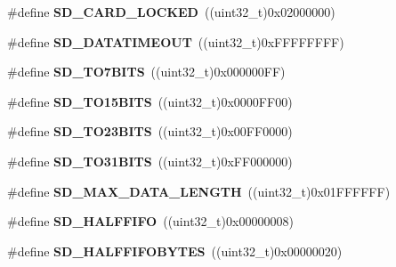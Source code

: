 \begin{DoxyCompactItemize}
\item 
\#define {\bfseries S\+D\+\_\+\+C\+A\+R\+D\+\_\+\+L\+O\+C\+K\+ED}~((uint32\+\_\+t)0x02000000)\hypertarget{group__sd__card__private_ga0560d0e5f15b8c676bd1c53bf0ac381f}{}\label{group__sd__card__private_ga0560d0e5f15b8c676bd1c53bf0ac381f}

\item 
\#define {\bfseries S\+D\+\_\+\+D\+A\+T\+A\+T\+I\+M\+E\+O\+UT}~((uint32\+\_\+t)0x\+F\+F\+F\+F\+F\+F\+F\+F)\hypertarget{group__sd__card__private_ga9ca34cf6f4e38835347bc2dc29f9469e}{}\label{group__sd__card__private_ga9ca34cf6f4e38835347bc2dc29f9469e}

\item 
\#define {\bfseries S\+D\+\_\+T\+O7\+B\+I\+TS}~((uint32\+\_\+t)0x000000\+F\+F)\hypertarget{group__sd__card__private_ga37de3e6a7edfd787d09efddc589120ae}{}\label{group__sd__card__private_ga37de3e6a7edfd787d09efddc589120ae}

\item 
\#define {\bfseries S\+D\+\_\+T\+O15\+B\+I\+TS}~((uint32\+\_\+t)0x0000\+F\+F00)\hypertarget{group__sd__card__private_ga2057731e114d40de0d0d6d2ff74f1501}{}\label{group__sd__card__private_ga2057731e114d40de0d0d6d2ff74f1501}

\item 
\#define {\bfseries S\+D\+\_\+T\+O23\+B\+I\+TS}~((uint32\+\_\+t)0x00\+F\+F0000)\hypertarget{group__sd__card__private_ga177a89af799d66f7782e6e8dd4e1438f}{}\label{group__sd__card__private_ga177a89af799d66f7782e6e8dd4e1438f}

\item 
\#define {\bfseries S\+D\+\_\+T\+O31\+B\+I\+TS}~((uint32\+\_\+t)0x\+F\+F000000)\hypertarget{group__sd__card__private_ga3d61f23b4fcf1efb4a16b26bd1f54550}{}\label{group__sd__card__private_ga3d61f23b4fcf1efb4a16b26bd1f54550}

\item 
\#define {\bfseries S\+D\+\_\+\+M\+A\+X\+\_\+\+D\+A\+T\+A\+\_\+\+L\+E\+N\+G\+TH}~((uint32\+\_\+t)0x01\+F\+F\+F\+F\+F\+F)\hypertarget{group__sd__card__private_ga3be502d718368f47d02b554e863f30b1}{}\label{group__sd__card__private_ga3be502d718368f47d02b554e863f30b1}

\item 
\#define {\bfseries S\+D\+\_\+\+H\+A\+L\+F\+F\+I\+FO}~((uint32\+\_\+t)0x00000008)\hypertarget{group__sd__card__private_ga96eec3ea095e393f51ab2686d928908c}{}\label{group__sd__card__private_ga96eec3ea095e393f51ab2686d928908c}

\item 
\#define {\bfseries S\+D\+\_\+\+H\+A\+L\+F\+F\+I\+F\+O\+B\+Y\+T\+ES}~((uint32\+\_\+t)0x00000020)\hypertarget{group__sd__card__private_ga95cd045964036c67c40103ab6aa504b7}{}\label{group__sd__card__private_ga95cd045964036c67c40103ab6aa504b7}


\end{DoxyCompactItemize}
